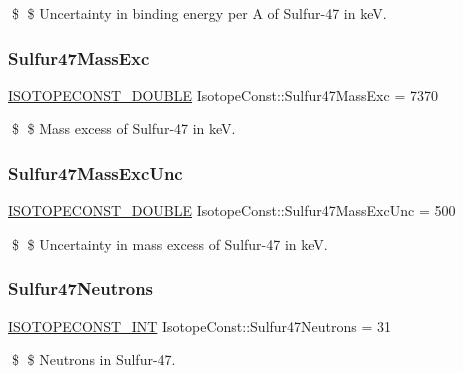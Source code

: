 \$ \$ Uncertainty in binding energy per A of Sulfur-\/47 in keV. \mbox{\label{group___isotope_const-_sulfur-_s47_gadad425a573452bc3ed03f84164b97eb2}} 
\subsubsection{\texorpdfstring{Sulfur47\+Mass\+Exc}{Sulfur47MassExc}}
{\footnotesize\ttfamily \mbox{\hyperlink{group___isotope_const-_macros_ga8f45a7272ce02c0b4c65c44636ed719a}{I\+S\+O\+T\+O\+P\+E\+C\+O\+N\+S\+T\+\_\+\+D\+O\+U\+B\+LE}} Isotope\+Const\+::\+Sulfur47\+Mass\+Exc = 7370}

\$ \$ Mass excess of Sulfur-\/47 in keV. \mbox{\label{group___isotope_const-_sulfur-_s47_ga95b8efd65438e9654994cca6ef793183}} 
\subsubsection{\texorpdfstring{Sulfur47\+Mass\+Exc\+Unc}{Sulfur47MassExcUnc}}
{\footnotesize\ttfamily \mbox{\hyperlink{group___isotope_const-_macros_ga8f45a7272ce02c0b4c65c44636ed719a}{I\+S\+O\+T\+O\+P\+E\+C\+O\+N\+S\+T\+\_\+\+D\+O\+U\+B\+LE}} Isotope\+Const\+::\+Sulfur47\+Mass\+Exc\+Unc = 500}

\$ \$ Uncertainty in mass excess of Sulfur-\/47 in keV. \mbox{\label{group___isotope_const-_sulfur-_s47_gaabfae55663682b4349241cc9c795be04}} 
\subsubsection{\texorpdfstring{Sulfur47\+Neutrons}{Sulfur47Neutrons}}
{\footnotesize\ttfamily \mbox{\hyperlink{group___isotope_const-_macros_ga5f18360b3e99483a35c32d789e62621c}{I\+S\+O\+T\+O\+P\+E\+C\+O\+N\+S\+T\+\_\+\+I\+NT}} Isotope\+Const\+::\+Sulfur47\+Neutrons = 31}

\$ \$ Neutrons in Sulfur-\/47. \mbox{\label{group___isotope_const-_sulfur-_s47_ga4ed39c9d0bab4067752b54bf460d96b3}} 
